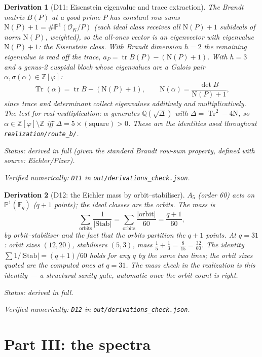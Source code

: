 \documentclass[11pt]{article}
\newtheorem{deriv}{Derivation}
\theoremstyle{remark}
\newcommand{\Nm}{\mathrm{N}}
\newcommand{\bucket}[1]{\par\smallskip\noindent\textit{Status: #1.}}
\newcommand{\chk}[1]{\par\noindent\textit{Verified numerically:
\texttt{#1} in \texttt{out/derivations\_check.json}.}}
\begin{document}
\begin{deriv}[D11: Eisenstein eigenvalue and trace extraction]\label{d11}
The Brandt matrix $B(P)$ at a good prime $P$ has constant row sums
$\Nm(P) + 1 = \#\mathbb{P}^1(\mathcal{O}_K/P)$ (each ideal class
receives all $\Nm(P)+1$ subideals of norm $\Nm(P)$, weighted), so the
all-ones vector is an eigenvector with eigenvalue $\Nm(P)+1$: the
Eisenstein class. With Brandt dimension $h = 2$ the remaining
eigenvalue is read off the trace,
$a_P = \operatorname{tr} B(P) - (\Nm(P) + 1)$. With $h = 3$ and a
genus-2 cuspidal block whose eigenvalues are a Galois pair
$\alpha, \sigma(\alpha) \in \mathbb{Z}[\varphi]$:
\[
\operatorname{Tr}(\alpha) = \operatorname{tr} B - (\Nm(P)+1),
\qquad
\mathrm{N}(\alpha) = \frac{\det B}{\Nm(P)+1},
\]
since trace and determinant collect eigenvalues additively and
multiplicatively. The test for real multiplication: $\alpha$ generates
$\mathbb{Q}(\sqrt{\Delta})$ with
$\Delta = \operatorname{Tr}^2 - 4\mathrm{N}$, so
$\alpha \in \mathbb{Z}[\varphi] \setminus \mathbb{Z}$ iff
$\Delta = 5 \times (\text{square}) > 0$. These are the identities
used throughout \texttt{realization/route\_b/}.
\bucket{derived in full (given the standard Brandt row-sum property,
defined with source: Eichler/Pizer)}\chk{D11}
\end{deriv}

\begin{deriv}[D12: the Eichler mass by orbit--stabiliser]\label{d12}
$A_5$ (order 60) acts on $\mathbb{P}^1(\mathbb{F}_q)$ ($q+1$ points);
the ideal classes are the orbits. The mass is
\[
\sum_{\text{orbits}} \frac{1}{|\mathrm{Stab}|}
= \sum_{\text{orbits}} \frac{|\text{orbit}|}{60}
= \frac{q+1}{60},
\]
by orbit--stabiliser and the fact that the orbits partition the
$q + 1$ points. At $q = 31$: orbit sizes $(12, 20)$, stabilisers
$(5, 3)$, mass $\tfrac15 + \tfrac13 = \tfrac{8}{15} = \tfrac{32}{60}$.
The identity $\sum 1/|\mathrm{Stab}| = (q+1)/60$ holds for any $q$
by the same two lines; the orbit sizes quoted are the computed ones at
$q = 31$. The mass check in the realization is this identity --- a
structural sanity gate, automatic once the orbit count is right.
\bucket{derived in full}\chk{D12}
\end{deriv}

\section{Part III: the spectra}
\end{document}
